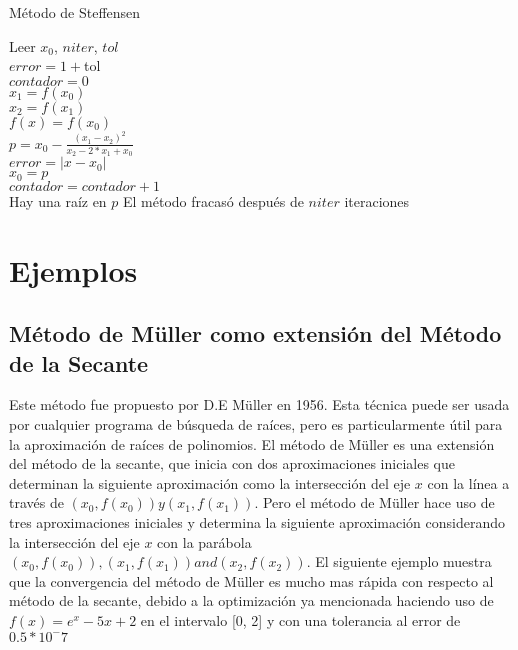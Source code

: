 \documentclass[12pt]{article}
\begin{document}
\begin{algorithm}[H]
	\caption{Método de Steffensen}
	\SetAlgoLined
	Leer $x_0$, $niter$, $tol$\\

	$error = 1 + $tol\\
	$contador = 0$\\
	{
		$x_1 = f(x_0)$\\
		$x_2 = f(x_1)$\\
		$f(x) = f(x_0)$\\
		$p = x_0 - \frac{(x_1-x_2)^2}{x_2-2*x_1+x_0}$\\
		$error = |x - x_0|$\\
		$x_0 = p$\\
		$contador = contador + 1$\\
	}
	{Hay una raíz en $p$}
	{El método fracasó después de $niter$ iteraciones}
\end{algorithm}

\section{Ejemplos}
\subsection{Método de Müller como extensión del Método de la Secante}
Este método fue propuesto por D.E Müller en 1956. Esta técnica puede ser usada por cualquier programa de búsqueda de raíces, pero es particularmente útil para la aproximación de raíces de polinomios. El método de Müller es una extensión del método de la secante, que inicia con dos aproximaciones iniciales que determinan la siguiente aproximación como la intersección del eje $x$ con la línea a través de $(x_{0}, f(x_{0})) y (x_{1}, f(x_{1}))$.
Pero el método de Müller hace uso de tres aproximaciones iniciales y determina la siguiente aproximación considerando la intersección del eje $x$ con la parábola $(x_{0}, f(x_{0})), (x_{1}, f(x_{1})) and (x_{2}, f(x_{2})) $.
El siguiente ejemplo muestra que la convergencia del método de Müller es mucho mas rápida con respecto al método de la secante, debido a la optimización ya mencionada haciendo uso de 
$f(x) = e^x - 5x + 2$ en el intervalo [0, 2] y con una tolerancia al error de $0.5 * 10^-7$
\end{document}
